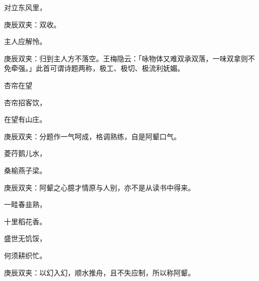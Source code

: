 \begin{poem}
    \begin{pl}对立东风里，\end{pl}\begin{note}庚辰双夹：双收。\end{note}

    \begin{pl}主人应解怜。\end{pl}\begin{note}庚辰双夹：归到主人方不落空。王梅隐云：「咏物体又难双承双落，一味双拿则不免牵强。」此首可谓诗题两称，极工、极切、极流利妩媚。\end{note}
\end{poem}


\begin{poem}
    \begin{pl}杏帘在望\end{pl}

    \begin{pl}杏帘招客饮，\end{pl}

    \begin{pl}在望有山庄。\end{pl}\begin{note}庚辰双夹：分题作一气呵成，格调熟练，自是阿颦口气。\end{note}

    \begin{pl}菱荇鹅儿水，\end{pl}

    \begin{pl}桑榆燕子梁。\end{pl}\begin{note}庚辰双夹：阿颦之心臆才情原与人别，亦不是从读书中得来。\end{note}

    \begin{pl}一畦春韭熟，\end{pl}

    \begin{pl}十里稻花香。\end{pl}

    \begin{pl}盛世无饥馁，\end{pl}

    \begin{pl}何须耕织忙。\end{pl}\begin{note}庚辰双夹：以幻入幻，顺水推舟，且不失应制，所以称阿颦。\end{note}

\end{poem}


